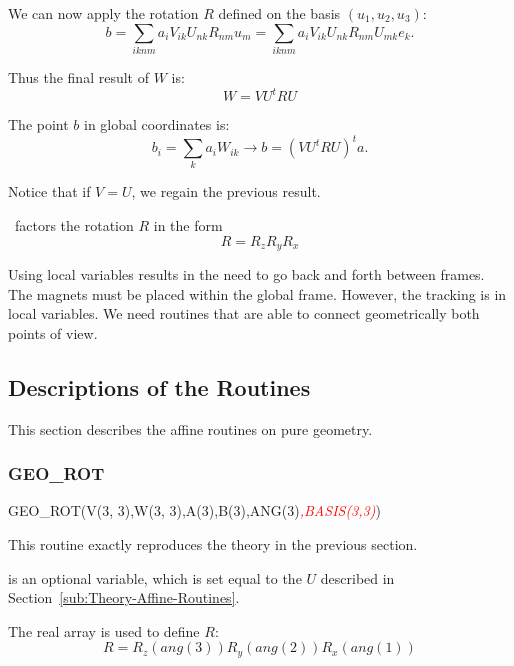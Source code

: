 We can now apply the rotation $R$ defined on the basis $(u_1,u_2,u_3)$:
\begin{equation*}
  b = \sum_{iknm} a_i V_{ik} U_{nk} R_{nm} u_m
    = \sum_{iknm} a_i V_{ik} U_{nk} R_{nm} U_{mk} e_k.
\end{equation*}

Thus the final result of $W$ is:
\begin{equation*}
  W = VU^t RU
\end{equation*}

The point $b$ in global coordinates is:
\begin{equation*}
  b_i = \sum_k a_i W_{ik}
  \rightarrow b = (VU^t RU)^t a.
\end{equation*}

Notice that if $V=U$, we regain the previous result.

\PTC\ factors the rotation $R$ in the form
\begin{equation*}
  R = R_z R_y R_x
\end{equation*}

Using local variables results in the need to go back and forth between frames.
The magnets must be placed within the global frame. However, the tracking is
in local variables. We need routines that are able to connect geometrically
both points of view.


\subsection{Descriptions of the Routines}

This section describes the affine routines on pure geometry.


\subsubsection{GEO\_ROT}

\begin{ptccode}
GEO_ROT(V(3, 3),W(3, 3),A(3),B(3),ANG(3)\textit{\textcolor{red}{,BASIS(3,3)}})
\end{ptccode}

%
This routine exactly reproduces the theory in the previous section.

 is an optional variable, which is set equal to the $U$ described
in Section~\ref{sub:Theory-Affine-Routines}.

The real array  is used to define $R$:
\begin{equation*}
R = R_z (ang(3)) R_y (ang(2)) R_x (ang(1))
\end{equation*}

